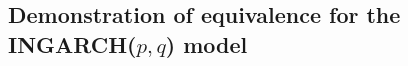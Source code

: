 \documentclass{article}
\begin{document}
%
%
%
%
%
%  




\subsection{Demonstration of equivalence for the INGARCH($p, q$) model}
\end{document}

